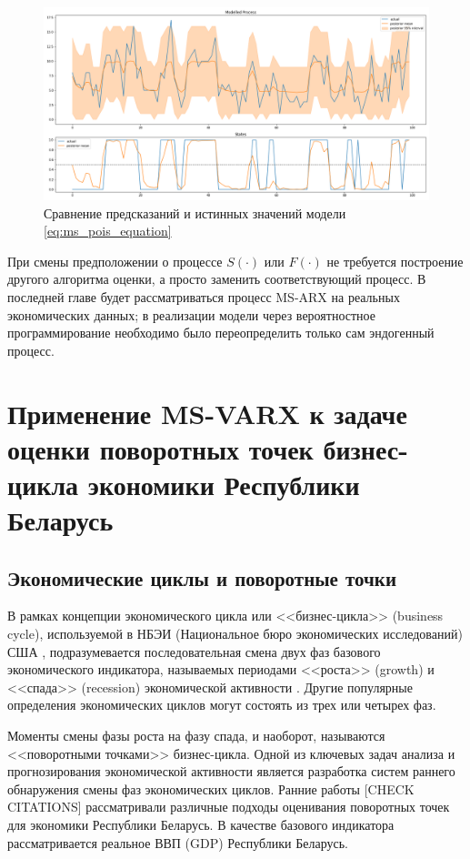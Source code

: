 \documentclass[a4paper,14pt]{extreport}
\begin{document}
\begin{figure}[H]
	\includegraphics[width=\linewidth]{img/gen/pp_ms_pois_fit.png}
	\caption{Сравнение предсказаний и истинных значений модели \ref{eq:ms_pois_equation}}
	\label{fig:pp_ms_pois_fit}
\end{figure}

При смены предположении о процессе $S(\cdot)$ или $F(\cdot)$ не требуется построение другого алгоритма оценки, а просто заменить соответствующий процесс. В последней главе будет рассматриваться процесс MS-ARX на реальных экономических данных; в реализации модели через вероятностное программирование необходимо было переопределить только сам эндогенный процесс.


\chapter{Применение MS-VARX к задаче оценки поворотных точек бизнес-цикла экономики Республики Беларусь}
\section{Экономические циклы и поворотные точки}

В рамках концепции экономического цикла или <<бизнес-цикла>> (business cycle), используемой в НБЭИ (Национальное бюро экономических исследований) США \cite{nberDevelopment}, подразумевается последовательная смена двух фаз базового экономического индикатора, называемых периодами <<роста>> (growth) и <<спада>> (recession) экономической активности \cite{oecdCycleExtraction}. Другие популярные определения экономических циклов могут состоять из трех или четырех фаз.

Моменты смены фазы роста на фазу спада, и наоборот, называются <<поворотными точками>> бизнес-цикла. Одной из ключевых задач анализа и прогнозирования экономической активности является разработка систем раннего обнаружения смены фаз экономических циклов.  Ранние работы \cite{esiMaking,esiExtra,mak_mal_bv_2018} [CHECK CITATIONS] рассматривали различные подходы оценивания поворотных точек для экономики Республики Беларусь. В качестве базового индикатора рассматривается реальное ВВП (GDP) Республики Беларусь.
\end{document}
